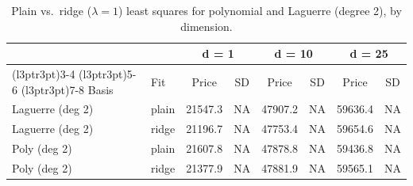\begin{table}

\caption{\label{tab:basis_function_ridge}Plain vs.\ ridge ($\lambda=1$) least squares for polynomial and Laguerre
      (degree 2), by dimension.}
\centering
\begin{tabular}[t]{llcccccc}
\toprule
\multicolumn{2}{c}{ } & \multicolumn{2}{c}{d = 1} & \multicolumn{2}{c}{d = 10} & \multicolumn{2}{c}{d = 25} \\
\cmidrule(l{3pt}r{3pt}){3-4} \cmidrule(l{3pt}r{3pt}){5-6} \cmidrule(l{3pt}r{3pt}){7-8}
Basis & Fit & Price & SD & Price & SD & Price & SD\\
\midrule
Laguerre (deg 2) & plain & 21547.3 & NA & 47907.2 & NA & 59636.4 & NA\\
Laguerre (deg 2) & ridge & 21196.7 & NA & 47753.4 & NA & 59654.6 & NA\\
\addlinespace
Poly (deg 2) & plain & 21607.8 & NA & 47878.8 & NA & 59436.8 & NA\\
Poly (deg 2) & ridge & 21377.9 & NA & 47881.9 & NA & 59565.1 & NA\\
\bottomrule
\end{tabular}
\end{table}
